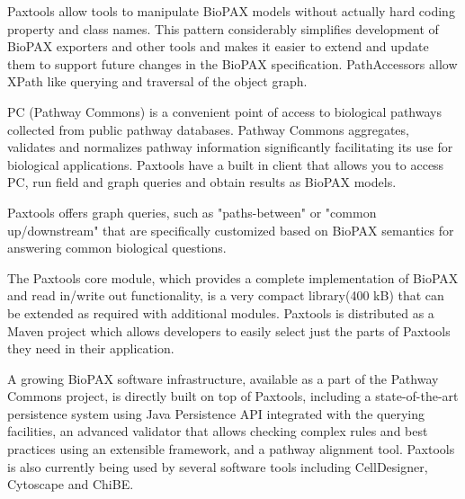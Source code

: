 \documentclass{tufte-book}
\begin{document}
 Paxtools allow tools to manipulate BioPAX models without actually hard coding property and class names. This pattern considerably simplifies development of BioPAX exporters and other tools and makes it easier to extend and update them to support future changes in the BioPAX specification. PathAccessors allow XPath like querying and traversal of the object graph. 

 PC (Pathway Commons)\cite{Cerami2011} is a convenient point of access to biological pathways collected from public pathway databases. Pathway Commons aggregates, validates and normalizes pathway information significantly facilitating its use for biological applications. Paxtools have a built in client that allows you to access PC, run field and graph queries and obtain results as BioPAX models. 

 Paxtools offers graph queries, such as "paths-between" or "common up/downstream" that are specifically customized based on BioPAX semantics for answering common biological questions. 

 The Paxtools core module, which provides a complete implementation of BioPAX and read in/write out functionality, is a very compact library(400 kB) that can be extended as required with additional modules. Paxtools is distributed as a Maven project which allows developers to easily select just the parts of Paxtools they need in their application.

 A growing BioPAX software infrastructure, available as a part of the Pathway Commons project, is directly built on top of Paxtools, including a state-of-the-art persistence system using Java Persistence API integrated with the querying facilities, an advanced validator that allows checking complex rules and best practices using an extensible framework, and a pathway alignment tool. Paxtools is also currently being used by several software tools including CellDesigner\cite{mi2011}, Cytoscape\cite{Cline2007} and ChiBE\cite{Babur2010}. 
\bigskip
\end{document}
